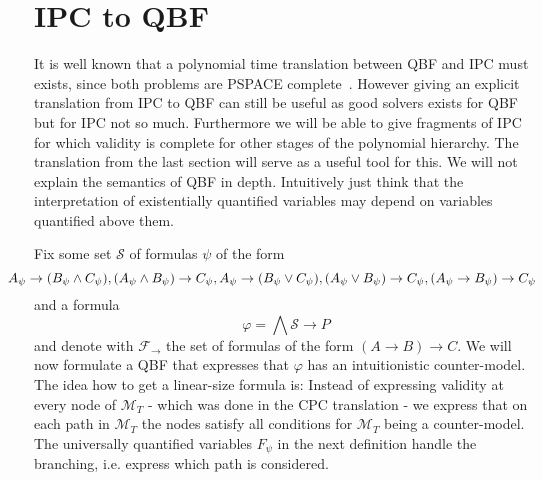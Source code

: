 \documentclass[a4paper,UKenglish,cleveref, autoref, thm-restate]{lipics-v2021}
\begin{document}
\section{IPC to QBF}

It is well known that a polynomial time translation between QBF and IPC must exists, since both problems are PSPACE complete~\cite{garey1979computers, statman1979intuitionistic}. However giving an explicit translation from IPC to QBF can still be useful as good solvers exists for QBF but for IPC not so much. Furthermore we will be able to give fragments of IPC for which validity is complete for other stages of the polynomial hierarchy. The translation from the last section will serve as a useful tool for this. We will not explain the semantics of QBF in depth. Intuitively just think that the interpretation of existentially quantified variables may depend on variables quantified above them.

Fix some set $\mathcal S$ of formulas $\psi$ of the form $$\hspace*{-.7cm}A_\psi\to (B_\psi\wedge C_\psi), (A_\psi\wedge B_\psi)\to C_\psi, A_\psi\to (B_\psi\vee C_\psi), (A_\psi\vee B_\psi)\to C_\psi, (A_\psi\to B_\psi)\to C_\psi$$and a formula $$\varphi = \bigwedge \mathcal S\to P$$
and denote with $\mathcal F_\to$ the set of formulas of the form $(A\to B)\to C$. We will now formulate a QBF that expresses that $\varphi$ has an intuitionistic counter-model. The idea how to get a linear-size formula is: Instead of expressing validity at every node of $\mathcal M_T$ - which was done in the CPC translation - we express that on each path in $\mathcal M_T$ the nodes satisfy all conditions for $\mathcal M_T$ being a counter-model. The universally quantified variables $F_\psi$ in the next definition handle the branching, i.e. express which path is considered.
\end{document}
